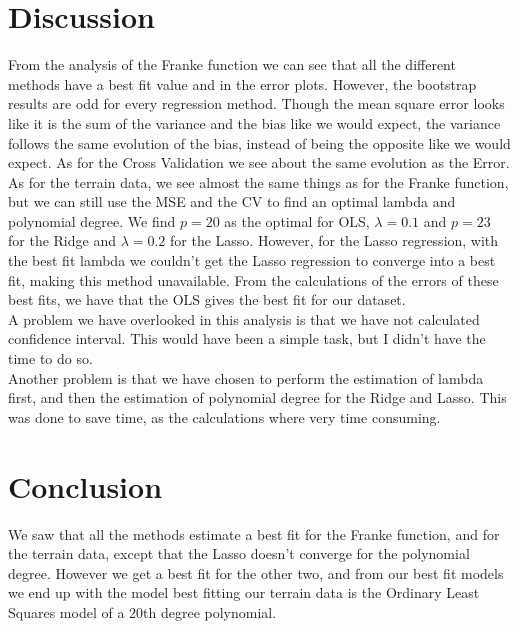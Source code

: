 \documentclass[11pt, A4paper, english]{article}
\begin{document}
\begin{multicols}{2}
		\section{Discussion}
From the analysis of the Franke function we can see that all the different methods have a best fit value and in the error plots. However, the bootstrap results are odd for every regression method. Though the mean square error looks like it is the sum of the variance and the bias like we would expect, the variance follows the same evolution of the bias, instead of being the opposite like we would expect. As for the Cross Validation we see about the same evolution as the Error. As for the terrain data, we see almost the same things as for the Franke function, but we can still use the MSE and the CV to find an optimal lambda and polynomial degree. We find $p = 20$ as the optimal for OLS, $\lambda = 0.1$ and $p = 23$ for the Ridge and $\lambda = 0.2$ for the Lasso. However, for the Lasso regression, with the best fit lambda we couldn't get the Lasso regression to converge into a best fit, making this method unavailable. From the calculations of the errors of these best fits, we have that the OLS gives the best fit for our dataset. \\
A problem we have overlooked in this analysis is that we have not calculated confidence interval. This would have been a simple task, but I didn't have the time to do so. \\
Another problem is that we have chosen to perform the estimation of lambda first, and then the estimation of polynomial degree for the Ridge and Lasso. This was done to save time, as the calculations where very time consuming.

		\section{Conclusion}
We saw that all the methods estimate a best fit for the Franke function, and for the terrain data, except that the Lasso doesn't converge for the polynomial degree. However we get a best fit for the other two, and from our best fit models we end up with the model best fitting our terrain data is the Ordinary Least Squares model of a $20$th degree polynomial.
		

\end{multicols}
\end{document}

